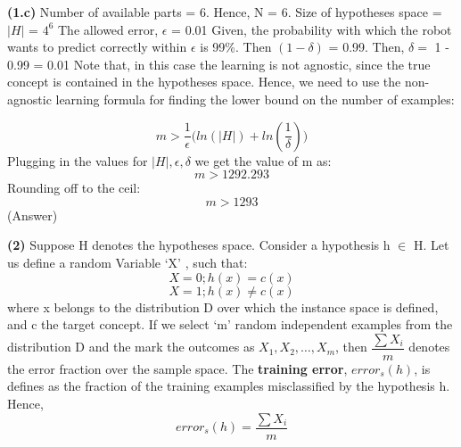 \documentclass{article}
\renewcommand\part[1]{\vspace{.10in}\textbf{(#1)}}
\begin{document}
  \part{1.c} Number of available parts = 6. Hence, N = 6. \newline
  \hspace*{0.5cm} Size of hypotheses space = $|H|$ = $4^6$ \newline
  The allowed error,  $\epsilon$ = 0.01 \newline
  Given, the probability with which the robot wants to predict correctly within $\epsilon$ is 99\%. Then $(1-\delta)$ = 0.99. \newline
  \hspace*{0.5cm} Then, $\delta = $ 1 - 0.99 = 0.01 \newline
  Note that, in this case the learning is not agnostic, since the true concept is contained in the hypotheses space. Hence, we need to use the non-agnostic learning formula for finding the lower bound on the number of examples: \newline
  
  \begin{equation}
    m > \dfrac{1}{\epsilon}\bigg (  ln(|H|) + ln(\dfrac{1}{\delta})\bigg)
  \end{equation}
  Plugging in the values for $|H|, \epsilon , \delta$ we get the value of m as: \newline
  \[ m > 1292.293 \]
  Rounding off to the ceil:
  \[  m > 1293 \]
  (Answer)
  
  \part{2}
  Suppose H denotes the hypotheses space. Consider a hypothesis h $\in$ H. Let us define a random Variable `X' , such that:
  \[ X = 0 ; h(x)=c(x) \]
  \[ X = 1 ; h(x) \neq c(x) \]
  where x belongs to the distribution D over which the instance space is defined, and c the target concept. \newline
  If we select `m' random independent examples from the distribution D and the mark the outcomes as $X_{1},X_{2},\dots,X_{m}$, then $\dfrac{\sum X_{i}}{m}$ denotes the error fraction over the sample space. The \textbf {training error}, $error_{s}(h)$, is defines as the fraction of the training examples misclassified by the hypothesis h. Hence, \newline
  \begin{equation}
  error_{s}(h) = \dfrac{\sum X_{i}}{m}
  \end{equation}
  
\end{document}
